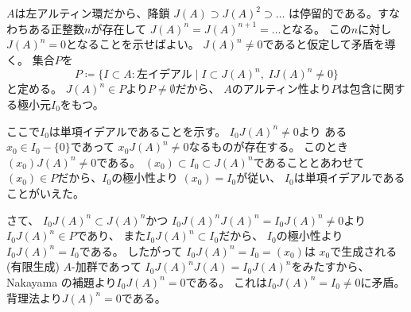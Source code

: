 \documentclass[report]{jlreq}
\begin{document}
\begin{answer}

    \cite[p.172]{AF92}

    $A$は左アルティン環だから、降鎖
    $J(A) \supset J(A)^2 \supset \dots$
    は停留的である。すなわちある正整数$n$が存在して
    $J(A)^n = J(A)^{n + 1} = \dots$となる。
    この$n$に対し$J(A)^n = 0$となることを示せばよい。
    $J(A)^n \neq 0$であると仮定して矛盾を導く。
    集合$P$を
    \begin{equation}
        P \coloneqq \{
            I \subset A \colon \text{左イデアル}
            \mid
            I \subset J(A)^n, \; IJ(A)^n \neq 0
        \}
    \end{equation}
    と定める。
    $J(A)^n \in P$より$P \neq \emptyset$だから、
    $A$のアルティン性より$P$は包含に関する極小元$I_0$をもつ。

    ここで$I_0$は単項イデアルであることを示す。
    $I_0 J(A)^n \neq 0$より
    ある$x_0 \in I_0 - \{ 0 \}$であって
    $x_0 J(A)^n \neq 0$なるものが存在する。
    このとき$(x_0) J(A)^n \neq 0$である。
    $(x_0) \subset I_0 \subset J(A)^n$であることとあわせて
    $(x_0) \in P$だから、$I_0$の極小性より
    $(x_0) = I_0$が従い、
    $I_0$は単項イデアルであることがいえた。

    さて、
    $I_0 J(A)^n \subset J(A)^n$かつ
    $I_0 J(A)^n J(A)^n = I_0 J(A)^n \neq 0$より
    $I_0 J(A)^n \in P$であり、
    また$I_0 J(A)^n \subset I_0$だから、
    $I_0$の極小性より
    $I_0 J(A)^n = I_0$である。
    したがって
    $I_0 J(A)^n = I_0 = (x_0)$は
    $x_0$で生成される (有限生成) $A$-加群であって
    $I_0 J(A)^n J(A) = I_0 J(A)^n$をみたすから、
    Nakayama の補題より$I_0 J(A)^n = 0$である。
    これは$I_0 J(A)^n = I_0 \neq 0$に矛盾。
    背理法より$J(A)^n = 0$である。
\end{answer}


\begin{answer}
\end{answer}

\end{document}

